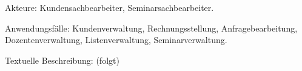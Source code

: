 \documentclass[parskip=full]{scrartcl}
\begin{document}
Akteure: Kundensachbearbeiter, Seminarsachbearbeiter.

Anwendungsfälle: Kundenverwaltung, Rechnungsstellung, Anfragebearbeitung, Dozentenverwaltung, Listenverwaltung, Seminarverwaltung.

Textuelle Beschreibung: (folgt)



%
%
\printnoidxglossaries
\end{document}
